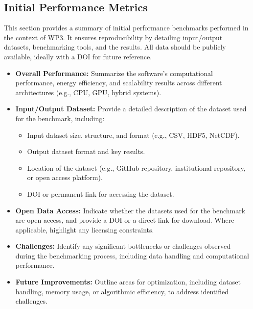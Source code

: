 \subsection{Initial Performance Metrics}
\label{sec:WP3:HPDDM:metrics}

This section provides a summary of initial performance benchmarks performed in the context of WP3. It ensures reproducibility by detailing input/output datasets, benchmarking tools, and the results. All data should be publicly available, ideally with a DOI for future reference.

\begin{itemize}
    \item \textbf{Overall Performance:} Summarize the software's computational performance, energy efficiency, and scalability results across different architectures (e.g., CPU, GPU, hybrid systems).
    \item \textbf{Input/Output Dataset:} Provide a detailed description of the dataset used for the benchmark, including:
        \begin{itemize}
            \item Input dataset size, structure, and format (e.g., CSV, HDF5, NetCDF).
            \item Output dataset format and key results.
            \item Location of the dataset (e.g., GitHub repository, institutional repository, or open access platform).
            \item DOI or permanent link for accessing the dataset.
        \end{itemize}
    \item \textbf{Open Data Access:} Indicate whether the datasets used for the benchmark are open access, and provide a DOI or a direct link for download. Where applicable, highlight any licensing constraints.
    \item \textbf{Challenges:} Identify any significant bottlenecks or challenges observed during the benchmarking process, including data handling and computational performance.
    \item \textbf{Future Improvements:} Outline areas for optimization, including dataset handling, memory usage, or algorithmic efficiency, to address identified challenges.
\end{itemize}

